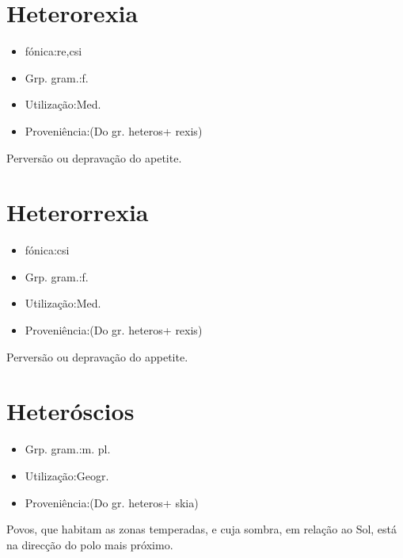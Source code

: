 \documentclass{article}
\begin{document}
\section{Heterorexia}
\begin{itemize}
\item {fónica:re,csi}
\end{itemize}
\begin{itemize}
\item {Grp. gram.:f.}
\end{itemize}
\begin{itemize}
\item {Utilização:Med.}
\end{itemize}
\begin{itemize}
\item {Proveniência:(Do gr. \textunderscore heteros\textunderscore  + \textunderscore rexis\textunderscore )}
\end{itemize}
Perversão ou depravação do apetite.
\section{Heterorrexia}
\begin{itemize}
\item {fónica:csi}
\end{itemize}
\begin{itemize}
\item {Grp. gram.:f.}
\end{itemize}
\begin{itemize}
\item {Utilização:Med.}
\end{itemize}
\begin{itemize}
\item {Proveniência:(Do gr. \textunderscore heteros\textunderscore  + \textunderscore rexis\textunderscore )}
\end{itemize}
Perversão ou depravação do appetite.
\section{Heteróscios}
\begin{itemize}
\item {Grp. gram.:m. pl.}
\end{itemize}
\begin{itemize}
\item {Utilização:Geogr.}
\end{itemize}
\begin{itemize}
\item {Proveniência:(Do gr. \textunderscore heteros\textunderscore  + \textunderscore skia\textunderscore )}
\end{itemize}
Povos, que habitam as zonas temperadas, e cuja sombra, em relação ao Sol, está na direcção do polo mais próximo.
\end{document}
